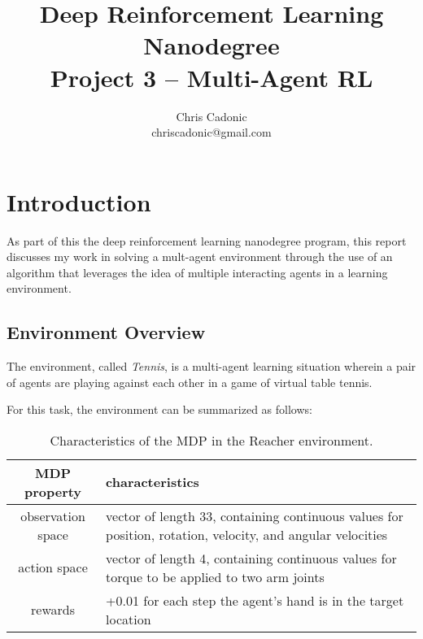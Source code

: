 \documentclass[11pt]{article}
\begin{document}
	
	\title{Deep Reinforcement Learning Nanodegree\\
		Project 3 -- Multi-Agent RL}
	\author{\vspace{-1mm}Chris Cadonic\\
		chriscadonic@gmail.com}
	\maketitle
	\vspace{-1.5em}
	
	\section{Introduction}
	
	As part of this the deep reinforcement learning nanodegree program, this report discusses my work in solving a mult-agent environment through the use of an algorithm that leverages the idea of multiple interacting agents in a learning environment.
	
	\subsection{Environment Overview}
	
	The environment, called \textit{Tennis}, is a multi-agent learning situation wherein a pair of agents are playing against each other in a game of virtual table tennis.
	
	
	For this task, the environment can be summarized as follows:
	
	\begin{table}[!ht]
		\centering
		\begin{tabular}{ c | p{10cm} }
			\textbf{MDP property} & \textbf{characteristics} \\
			\hline
			observation space & vector of length 33, containing continuous values for position, rotation, velocity, and angular velocities \\
			\hline
			action space & vector of length 4, containing continuous values for torque to be applied to two arm joints \\
			\hline
			rewards & +0.01 for each step the agent's hand is in the target location \\
			\hline
		\end{tabular}
		\caption{Characteristics of the MDP in the Reacher environment.}
		\label{tbl:mdp}
	\end{table}
	
	\FloatBarrier
	
\end{document}
